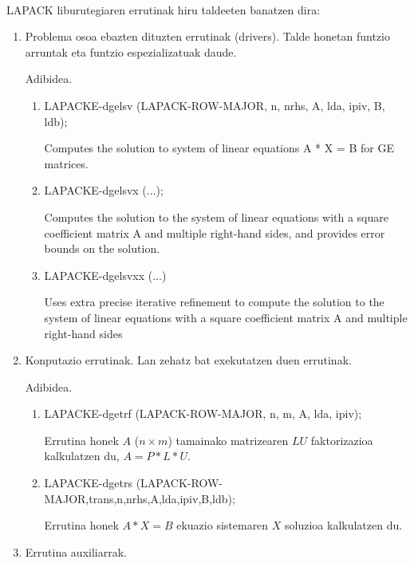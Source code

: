 \paragraph*{}LAPACK liburutegiaren errutinak hiru taldeeten banatzen dira:
\begin{enumerate}
\item Problema osoa ebazten dituzten errutinak (drivers). Talde honetan funtzio arruntak eta funtzio espezializatuak daude.

Adibidea.

\begin{enumerate}
\item LAPACKE-dgelsv (LAPACK-ROW-MAJOR, n, nrhs, A, lda, ipiv, B, ldb);

Computes the solution to system of linear equations A * X = B for GE matrices.

\item LAPACKE-dgelsvx (...);

Computes the solution to the system of linear equations with a square coefficient matrix A and multiple right-hand sides, and provides error bounds on the solution.

\item LAPACKE-dgelsvxx (...)

Uses extra precise iterative refinement to compute the solution to the system of linear equations with a square coefficient matrix A and multiple right-hand sides

\end{enumerate}

\item Konputazio errutinak. Lan zehatz bat exekutatzen duen errutinak.

Adibidea.

\begin{enumerate}
\item LAPACKE-dgetrf (LAPACK-ROW-MAJOR, n, m, A, lda, ipiv);

Errutina honek $A$ ($n \times m$) tamainako matrizearen $LU$ faktorizazioa kalkulatzen du, $A=P*L*U$.
\item LAPACKE-dgetrs (LAPACK-ROW-MAJOR,trans,n,nrhs,A,lda,ipiv,B,ldb);

Errutina honek $A*X=B$ ekuazio sistemaren $X$ soluzioa kalkulatzen du.
\end{enumerate}   

\item Errutina auxiliarrak.
\end{enumerate}


